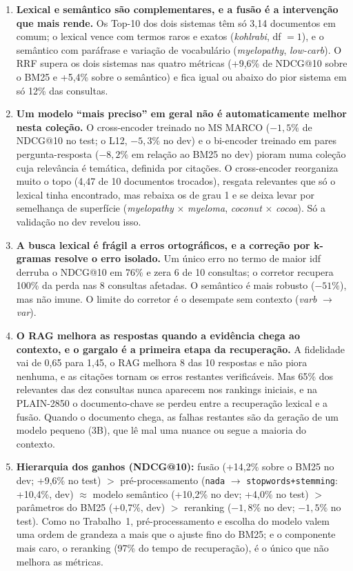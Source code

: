 \documentclass[10pt,a4paper]{article}
\newcommand{\pq}[1]{\mbox{PLAIN-#1}}        %
\begin{document}
\begin{enumerate}
\item \textbf{Lexical e semântico são complementares, e a fusão é a intervenção que mais rende.} Os Top-10 dos dois sistemas têm só 3,14 documentos em comum; o lexical vence com termos raros e exatos (\emph{kohlrabi}, df $= 1$), e o semântico com paráfrase e variação de vocabulário (\emph{myelopathy}, \emph{low-carb}). O RRF supera os dois sistemas nas quatro métricas (+9,6\% de NDCG@10 sobre o BM25 e +5,4\% sobre o semântico) e fica igual ou abaixo do pior sistema em só 12\% das consultas.
\item \textbf{Um modelo ``mais preciso'' em geral não é automaticamente melhor nesta coleção.} O cross-encoder treinado no MS MARCO ($-1{,}5\%$ de NDCG@10 no test; o L12, $-5{,}3\%$ no dev) e o bi-encoder treinado em pares pergunta-resposta ($-8{,}2\%$ em relação ao BM25 no dev) pioram numa coleção cuja relevância é temática, definida por citações. O cross-encoder reorganiza muito o topo (4,47 de 10 documentos trocados), resgata relevantes que só o lexical tinha encontrado, mas rebaixa os de grau 1 e se deixa levar por semelhança de superfície (\emph{myelopathy} $\times$ \emph{myeloma}, \emph{coconut} $\times$ \emph{cocoa}). Só a validação no dev revelou isso.
\item \textbf{A busca lexical é frágil a erros ortográficos, e a correção por k-gramas resolve o erro isolado.} Um único erro no termo de maior idf derruba o NDCG@10 em 76\% e zera 6 de 10 consultas; o corretor recupera 100\% da perda nas 8 consultas afetadas. O semântico é mais robusto ($-51\%$), mas não imune. O limite do corretor é o desempate sem contexto (\emph{varb} $\to$ \emph{var}).
\item \textbf{O RAG melhora as respostas quando a evidência chega ao contexto, e o gargalo é a primeira etapa da recuperação.} A fidelidade vai de 0,65 para 1,45, o RAG melhora 8 das 10 respostas e não piora nenhuma, e as citações tornam os erros restantes verificáveis. Mas 65\% dos relevantes das dez consultas nunca aparecem nos rankings iniciais, e na \pq{2850} o documento-chave se perdeu entre a recuperação lexical e a fusão. Quando o documento chega, as falhas restantes são da geração de um modelo pequeno (3B), que lê mal uma nuance ou segue a maioria do contexto.
\item \textbf{Hierarquia dos ganhos (NDCG@10):} fusão (+14,2\% sobre o BM25 no dev; +9,6\% no test) $>$ pré-processamento (\texttt{nada} $\to$ \texttt{stopwords+stemming}: +10,4\%, dev) $\approx$ modelo semântico (+10,2\% no dev; +4,0\% no test) $>$ parâmetros do BM25 (+0,7\%, dev) $>$ reranking ($-1{,}8\%$ no dev; $-1{,}5\%$ no test). Como no Trabalho~1, pré-processamento e escolha do modelo valem uma ordem de grandeza a mais que o ajuste fino do BM25; e o componente mais caro, o reranking (97\% do tempo de recuperação), é o único que não melhora as métricas.
\end{enumerate}
\end{document}
